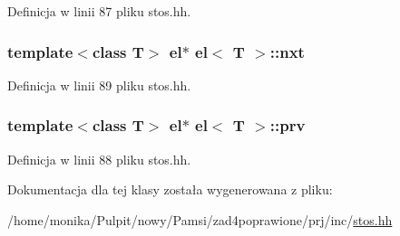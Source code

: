 \-Definicja w linii 87 pliku stos.\-hh.

\hypertarget{classel_aa1eac5dfc1ae72aa97ac92db49b4bc05}{
\subsubsection[{nxt}]{\setlength{\rightskip}{0pt plus 5cm}template$<$class \-T$>$ {\bf el}$\ast$ {\bf el}$<$ \-T $>$\-::{\bf nxt}}}\label{classel_aa1eac5dfc1ae72aa97ac92db49b4bc05}


\-Definicja w linii 89 pliku stos.\-hh.

\hypertarget{classel_a69d8939dbcd5c7fbb8467263f7000696}{
\subsubsection[{prv}]{\setlength{\rightskip}{0pt plus 5cm}template$<$class \-T$>$ {\bf el}$\ast$ {\bf el}$<$ \-T $>$\-::{\bf prv}}}\label{classel_a69d8939dbcd5c7fbb8467263f7000696}


\-Definicja w linii 88 pliku stos.\-hh.



\-Dokumentacja dla tej klasy została wygenerowana z pliku\-:\begin{DoxyCompactItemize}
\item 
/home/monika/\-Pulpit/nowy/\-Pamsi/zad4poprawione/prj/inc/\hyperlink{stos_8hh}{stos.\-hh}\end{DoxyCompactItemize}
